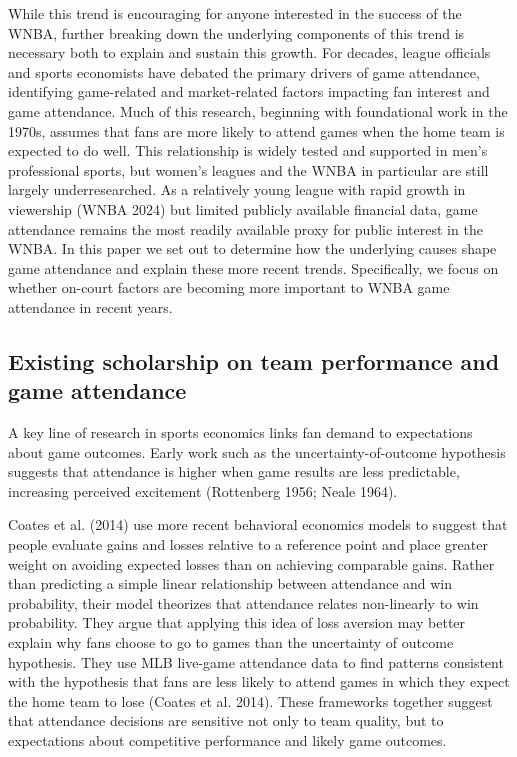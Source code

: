 \documentclass[
  letterpaper,
  DIV=11,
  numbers=noendperiod]{scrartcl}
\begin{document}
While this trend is encouraging for anyone interested in the success of
the WNBA, further breaking down the underlying components of this trend
is necessary both to explain and sustain this growth. For decades,
league officials and sports economists have debated the primary drivers
of game attendance, identifying game-related and market-related factors
impacting fan interest and game attendance. Much of this research,
beginning with foundational work in the 1970s, assumes that fans are
more likely to attend games when the home team is expected to do well.
This relationship is widely tested and supported in men's professional
sports, but women's leagues and the WNBA in particular are still largely
underresearched. As a relatively young league with rapid growth in
viewership (WNBA 2024) but limited publicly available financial data,
game attendance remains the most readily available proxy for public
interest in the WNBA. In this paper we set out to determine how the
underlying causes shape game attendance and explain these more recent
trends. Specifically, we focus on whether on-court factors are becoming
more important to WNBA game attendance in recent years.

\subsection{Existing scholarship on team performance and game
attendance}\label{existing-scholarship-on-team-performance-and-game-attendance}

A key line of research in sports economics links fan demand to
expectations about game outcomes. Early work such as the
uncertainty-of-outcome hypothesis suggests that attendance is higher
when game results are less predictable, increasing perceived excitement
(Rottenberg 1956; Neale 1964).

Coates et al. (2014) use more recent behavioral economics models to
suggest that people evaluate gains and losses relative to a reference
point and place greater weight on avoiding expected losses than on
achieving comparable gains. Rather than predicting a simple linear
relationship between attendance and win probability, their model
theorizes that attendance relates non-linearly to win probability. They
argue that applying this idea of loss aversion may better explain why
fans choose to go to games than the uncertainty of outcome hypothesis.
They use MLB live-game attendance data to find patterns consistent with
the hypothesis that fans are less likely to attend games in which they
expect the home team to lose (Coates et al. 2014). These frameworks
together suggest that attendance decisions are sensitive not only to
team quality, but to expectations about competitive performance and
likely game outcomes.
\end{document}
